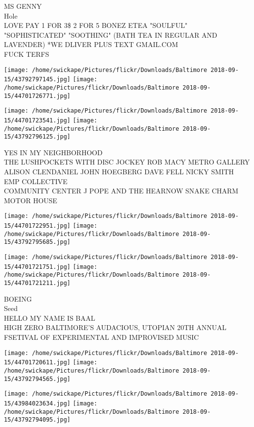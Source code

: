 \documentclass[10pt,letterpaper]{article}
\begin{document}
MS GENNY\\
Hole\\
LOVE PAY 1 FOR 3\$ 2 FOR 5 BONEZ ETEA "SOULFUL" "SOPHISTICATED" "SOOTHING" (BATH TEA IN REGULAR AND LAVENDER) *WE DLIVER PLUS TEXT GMAIL.COM\\
FUCK TERFS\\
\pagebreak

\texttt{[image: /home/swickape/Pictures/flickr/Downloads/Baltimore 2018-09-15/43792797145.jpg]}
\texttt{[image: /home/swickape/Pictures/flickr/Downloads/Baltimore 2018-09-15/44701726771.jpg]}

\texttt{[image: /home/swickape/Pictures/flickr/Downloads/Baltimore 2018-09-15/44701723541.jpg]}
\texttt{[image: /home/swickape/Pictures/flickr/Downloads/Baltimore 2018-09-15/43792796125.jpg]}

YES IN MY NEIGHBORHOOD\\
THE LUSHPOCKETS WITH DISC JOCKEY ROB MACY METRO GALLERY\\
ALISON CLENDANIEL JOHN HOEGBERG DAVE FELL NICKY SMITH EMP COLLECTIVE\\
COMMUNITY CENTER J POPE AND THE HEARNOW SNAKE CHARM MOTOR HOUSE\\
\pagebreak

\texttt{[image: /home/swickape/Pictures/flickr/Downloads/Baltimore 2018-09-15/44701722951.jpg]}
\texttt{[image: /home/swickape/Pictures/flickr/Downloads/Baltimore 2018-09-15/43792795685.jpg]}

\texttt{[image: /home/swickape/Pictures/flickr/Downloads/Baltimore 2018-09-15/44701721751.jpg]}
\texttt{[image: /home/swickape/Pictures/flickr/Downloads/Baltimore 2018-09-15/44701721211.jpg]}

BOEING\\
Seed\\
HELLO MY NAME IS BAAL\\
HIGH ZERO BALTIMORE'S AUDACIOUS, UTOPIAN 20TH ANNUAL FSETIVAL OF EXPERIMENTAL AND IMPROVISED MUSIC\\
\pagebreak

\texttt{[image: /home/swickape/Pictures/flickr/Downloads/Baltimore 2018-09-15/44701720611.jpg]}
\texttt{[image: /home/swickape/Pictures/flickr/Downloads/Baltimore 2018-09-15/43792794565.jpg]}

\texttt{[image: /home/swickape/Pictures/flickr/Downloads/Baltimore 2018-09-15/43984023634.jpg]}
\texttt{[image: /home/swickape/Pictures/flickr/Downloads/Baltimore 2018-09-15/43792794095.jpg]}
\end{document}
